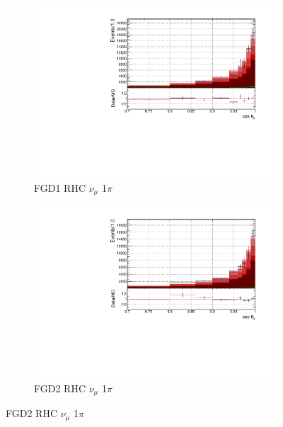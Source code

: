 \begin{figure}[!h]
\begin{subfigure}{0.49\textwidth}
  \centering
  \includegraphics[width=\textwidth]{figs/FGD1_NuMuBkg_CC1pi_in_AntiNu_Mode_t}
  \caption{FGD1 RHC $\nu_{\mu}$ 1$\pi$}
\end{subfigure}
\begin{subfigure}{0.49\textwidth}
  \centering
  \includegraphics[width=\textwidth]{figs/FGD2_NuMuBkg_CC1pi_in_AntiNu_Mode_t}
  \caption{FGD2 RHC $\nu_{\mu}$ 1$\pi$}
\end{subfigure}


\end{figure}
